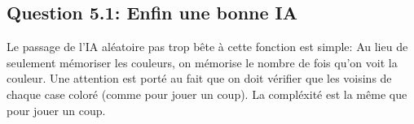 \documentclass[11pt]{article}
\begin{document}
    \subsection{Question 5.1: Enfin une bonne IA}

    Le passage de l'IA aléatoire pas trop bête à cette fonction est simple: Au lieu de seulement mémoriser les couleurs, on mémorise le nombre de fois qu'on voit la couleur. Une attention est porté au fait que on doit vérifier que les voisins de chaque case coloré (comme pour jouer un coup). La compléxité est la même que pour jouer un coup.

    
\end{document}
